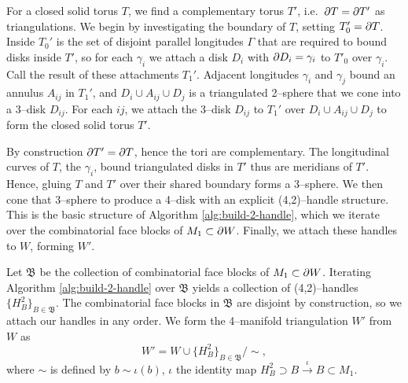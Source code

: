 For a closed solid torus $T$, we find a complementary torus $T'$, i.e.\ $\partial T=\partial T'$ as triangulations.
We begin by investigating the boundary of $T$, setting $T_0'=\partial T$.
Inside $T_0'$ is the set of disjoint parallel longitudes $\Gamma$ that are required to bound disks inside $T'$, so for each $\gamma_i$ we attach a disk $D_i$ with $\partial D_i=\gamma_i$ to $T'_0$ over $\gamma_i$.
Call the result of these attachments $T_1'$.
Adjacent longitudes $\gamma_i$ and $\gamma_j$ bound an annulus $A_{ij}$ in $T_1'$, and $D_i \cup A_{ij}\cup D_j$ is a triangulated 2--sphere that we cone into a 3--disk $D_{ij}$.
For each $ij$, we attach the 3--disk $D_{ij}$ to $T_1'$ over $D_i\cup A_{ij}\cup D_j$ to form the closed solid torus $T'$.

By construction $\partial T'=\partial T$, hence the tori are complementary.
The longitudinal curves of $T$, the $\gamma_i$, bound triangulated disks in $T'$ thus
are meridians of $T'$.
Hence, gluing $T$ and $T'$ over their shared boundary forms a 3--sphere.
We then cone that 3--sphere to produce a 4--disk with an explicit (4,2)--handle structure.
This is the basic structure of Algorithm \ref{alg:build-2-handle}, which we iterate over the combinatorial face blocks of $M_1\subset \partial W$.
Finally, we attach these handles to $W$, forming $W'$.

Let $\mathfrak{B}$ be the collection of combinatorial face blocks of $M_1\subset \partial W$.
Iterating Algorithm \ref{alg:build-2-handle} over $\mathfrak{B}$ yields a collection of (4,2)--handles $\{H_B^2\}_{B\in\mathfrak{B}}$.
The combinatorial face blocks in $\mathfrak{B}$ are disjoint by construction, so we attach our handles in any order.
We form the 4--manifold triangulation $W'$ from $W$ as
\[
	W' = W\cup\{H_B^2\}_{B\in\mathfrak{B}}/\sim,
\]
where $\sim$ is defined by $b\sim \iota(b)$, $\iota$ the identity map $H_B^2\supset B\overset{\iota}{\to} B\subset M_1$.



